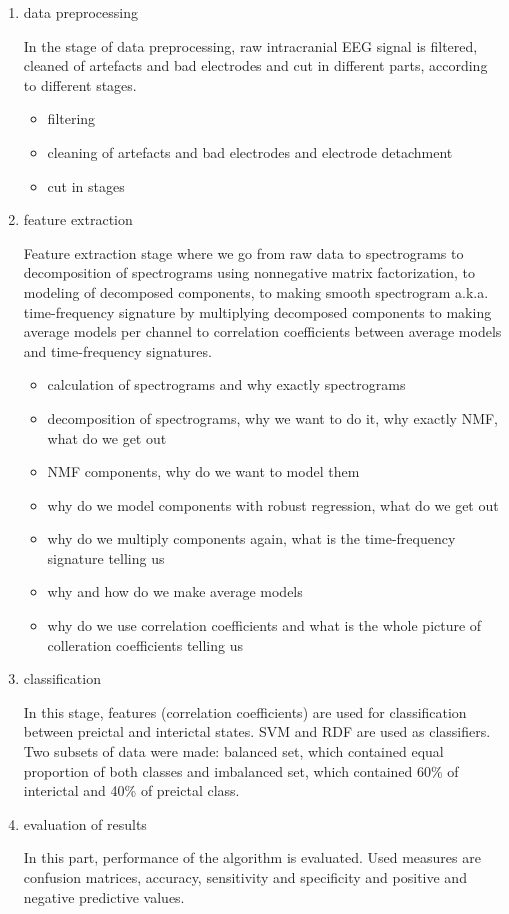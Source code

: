 \documentclass{article}
\begin{document}
\begin{enumerate}
\item data preprocessing

In the stage of data preprocessing, raw intracranial EEG signal is filtered, cleaned of artefacts and bad electrodes and cut in different parts, according to different stages.

\begin{itemize}
\item filtering
\item cleaning of artefacts and bad electrodes and electrode detachment
\item cut in stages
\end{itemize} 

\item feature extraction

Feature extraction stage where we go from raw data to spectrograms to decomposition of spectrograms using nonnegative matrix factorization, to modeling of decomposed components, to making smooth spectrogram a.k.a. time-frequency signature by multiplying decomposed components to making average models per channel to correlation coefficients between average models and time-frequency signatures. 

\begin{itemize}
\item calculation of spectrograms and why exactly spectrograms
\item decomposition of spectrograms, why we want to do it, why exactly NMF, what do we get out
\item NMF components, why do we want to model them
\item why do we model components with robust regression, what do we get out
\item why do we multiply components again, what is the time-frequency signature telling us
\item why and how do we make average models
\item why do we use correlation coefficients and what is the whole picture of colleration coefficients telling us
\end{itemize}
 

\item classification

In this stage, features (correlation coefficients) are used for classification between preictal and interictal states. SVM and RDF are used as classifiers. Two subsets of data were made: balanced set, which contained equal proportion of both classes and imbalanced set, which contained 60\% of interictal and 40\% of preictal class.  \\

\item evaluation of results

In this part, performance of the algorithm is evaluated. Used measures are confusion matrices, accuracy, sensitivity and specificity and positive and negative predictive values. \\

\end{enumerate}
\end{document}
